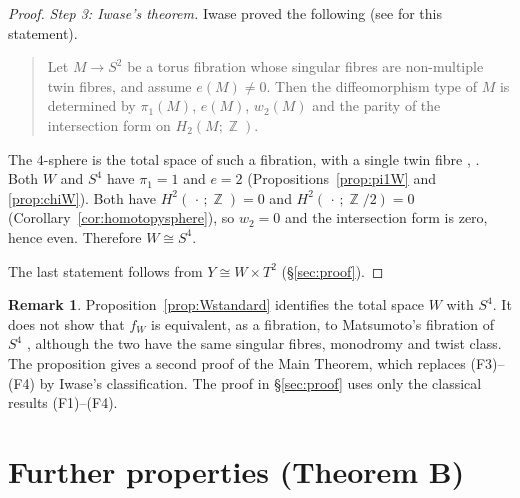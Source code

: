 \documentclass{article}
\DeclareMathOperator{\Z}{\mathbb{Z}}
\theoremstyle{definition}
\newtheorem{remark}[theorem]{Remark}
\theoremstyle{plain}
\begin{document}
\begin{proof}
\emph{Step 3: Iwase's theorem.} Iwase proved the following (see
\cite[\S1]{Matsumoto85} for this statement).
\begin{quote}
Let $M\to S^2$ be a torus fibration whose singular fibres are non-multiple twin
fibres, and assume $e(M)\neq0$. Then the diffeomorphism type of $M$ is determined by
$\pi_1(M)$, $e(M)$, $w_2(M)$ and the parity of the intersection form on $H_2(M;\Z)$.
\end{quote}
The $4$-sphere is the total space of such a fibration, with a single twin fibre
\cite{Matsumoto82}, \cite[\S2, \S4]{Matsumoto85}. Both $W$ and $S^4$ have $\pi_1=1$ and
$e=2$ (Propositions~\ref{prop:pi1W} and \ref{prop:chiW}). Both have $H^2(\,\cdot\,;\Z)=0$
and $H^2(\,\cdot\,;\Z/2)=0$ (Corollary~\ref{cor:homotopysphere}), so $w_2=0$ and the
intersection form is zero, hence even. Therefore $W\cong S^4$.

The last statement follows from $Y\cong W\times T^2$ (\S\ref{sec:proof}).
\end{proof}

\begin{remark}
Proposition~\ref{prop:Wstandard} identifies the total space $W$ with $S^4$. It does not
show that $f_W$ is equivalent, as a fibration, to Matsumoto's fibration of $S^4$
\cite{Matsumoto82,Matsumoto85,GompfStipsicz99}, although the two have the same singular
fibres, monodromy and twist class. The proposition gives a second proof of the Main
Theorem, which replaces (F3)--(F4) by Iwase's classification. The proof in
\S\ref{sec:proof} uses only the classical results (F1)--(F4).
\end{remark}

\section{Further properties (Theorem B)}\label{sec:props}
\end{document}
